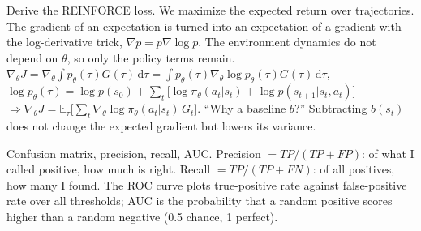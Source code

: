\begin{qabox}[Hochreiter]{\asked Derive the REINFORCE loss.}
\ans We maximize the expected return over trajectories. The gradient of an expectation is turned
into an expectation of a gradient with the log-derivative trick, $\nabla p=p\nabla\log p$. The
environment dynamics do not depend on $\theta$, so only the policy terms remain.
\formula
$\nabla_\theta J=\nabla_\theta\!\int p_\theta(\tau)G(\tau)\,\mathrm{d}\tau
=\int p_\theta(\tau)\nabla_\theta\log p_\theta(\tau)G(\tau)\,\mathrm{d}\tau$,\
$\log p_\theta(\tau)=\log p(s_0)+\sum_t\bigl[\log\pi_\theta(a_t|s_t)+\log p(s_{t+1}|s_t,a_t)\bigr]$\
$\Rightarrow\nabla_\theta J=\mathbb{E}_\tau\bigl[\sum_t\nabla_\theta\log\pi_\theta(a_t|s_t)\,G_t\bigr]$.
\follow ``Why a baseline $b$?'' Subtracting $b(s_t)$ does not change the expected gradient but
lowers its variance.
\end{qabox}

\begin{qabox}[general]{\asked Confusion matrix, precision, recall, AUC.}
\ans Precision $=TP/(TP+FP)$: of what I called positive, how much is right. Recall
$=TP/(TP+FN)$: of all positives, how many I found. The ROC curve plots true-positive rate against
false-positive rate over all thresholds; AUC is the probability that a random positive scores
higher than a random negative (0.5 chance, 1 perfect).
\end{qabox}
